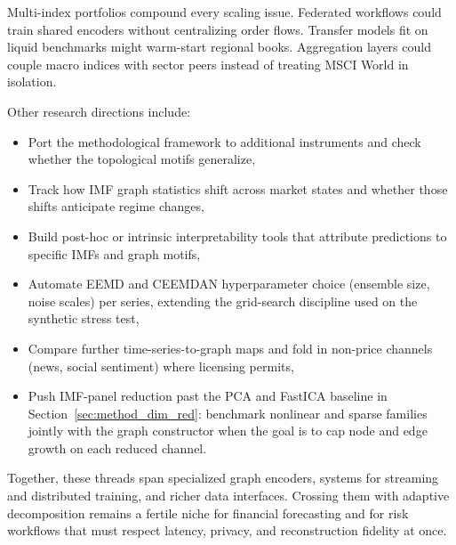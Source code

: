 \documentclass[11pt,a4paper]{article}
\begin{document}
Multi-index portfolios compound every scaling issue. Federated workflows could train shared encoders without centralizing order flows. Transfer models fit on liquid benchmarks might warm-start regional books. Aggregation layers could couple macro indices with sector peers instead of treating MSCI World in isolation.

Other research directions include:
\begin{itemize}
    \item Port the methodological framework to additional instruments and check whether the topological motifs generalize,
    \item Track how IMF graph statistics shift across market states and whether those shifts anticipate regime changes,
    \item Build post-hoc or intrinsic interpretability tools that attribute predictions to specific IMFs and graph motifs,
    \item Automate EEMD and CEEMDAN hyperparameter choice (ensemble size, noise scales) per series, extending the grid-search discipline used on the synthetic stress test,
    \item Compare further time-series-to-graph maps and fold in non-price channels (news, social sentiment) where licensing permits,
    \item Push IMF-panel reduction past the PCA and FastICA baseline in Section~\ref{sec:method_dim_red}: benchmark nonlinear and sparse families jointly with the graph constructor when the goal is to cap node and edge growth on each reduced channel.
\end{itemize}

Together, these threads span specialized graph encoders, systems for streaming and distributed training, and richer data interfaces. Crossing them with adaptive decomposition remains a fertile niche for financial forecasting and for risk workflows that must respect latency, privacy, and reconstruction fidelity at once.

\FloatBarrier
\end{document}
